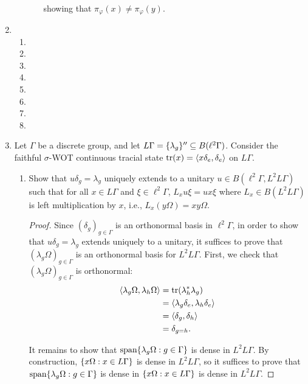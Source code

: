 \documentclass[a4paper,10pt]{report}
\newcommand{\ggen}[1]{\langle#1\rangle}
\DeclarePairedDelimiter{\set}{\{}{\}}
\begin{document}
\begin{enumerate}
\begin{enumerate}
\begin{enumerate}
\begin{align*}
							\end{align*}
							showing that $\pi_\varphi(x)\neq\pi_\varphi(y)$. 
				\end{enumerate}
		\end{enumerate}
		\setcounter{enumi}{90}
		\newpage
 \item 
		\begin{enumerate}
			\item 
			\item 
			\item 
			\item 
			\item 
			\item 
			\item 
			\item 
		\end{enumerate}
		\newpage
 \item 
 Let $\Gamma$ be a discrete group, and let $L\Gamma = \set{\lambda_g}'' \subseteq B(\ell^2\Gamma)$.
 Consider the faithful $\sigma$-WOT continuous tracial state
 $\tr(x) = \ggen{x\delta_e, \delta_e}$ on $L\Gamma$.
		\begin{enumerate}
			\item Show that $u\delta_g = \lambda_g$ uniquely extends to a unitary
				$u \in B(\ell^2\Gamma, L^2L\Gamma)$ such that for all $x \in L\Gamma$
				and $\xi \in \ell^2\Gamma$, $L_xu\xi = ux\xi$ where $L_x \in B(L^2L\Gamma)$
				is left multiplication by $x$, i.e., $L_x(y\Omega) = xy\Omega$.
				\begin{proof}
					Since $(\delta_g)_{g \in \Gamma}$ is an orthonormal basis in $\ell^2\Gamma$,
					in order to show that $u\delta_g = \lambda_g$ extends uniquely to a unitary,
					it suffices to prove that $(\lambda_g\Omega)_{g \in \Gamma}$ is an
					orthonormal basis for $L^2L\Gamma$.
					First, we check that $(\lambda_g\Omega)_{g \in \Gamma}$ is orthonormal:
					\begin{align*}
						\ggen{\lambda_g\Omega, \lambda_h\Omega}
						 & = \tr(\lambda_h^*\lambda_g) \\
						 & = \ggen{\lambda_g\delta_e, \lambda_h\delta_e} \\
						 & = \ggen{\delta_g, \delta_h} \\
						 & = \delta_{g = h}.
					\end{align*}
					
					It remains to show that $\text{span}\set{\lambda_g\Omega : g \in \Gamma}$
					is dense in $L^2L\Gamma$.
					By construction, $\set{x\Omega : x \in L\Gamma}$ is dense in $L^2L\Gamma$,
					so it suffices to prove that $\text{span}\set{\lambda_g\Omega : g \in \Gamma}$
					is dense in $\set{x\Omega : x \in L\Gamma}$ is dense in $L^2L\Gamma$.
					

\end{proof}
\end{enumerate}
\end{enumerate}
\end{document}
